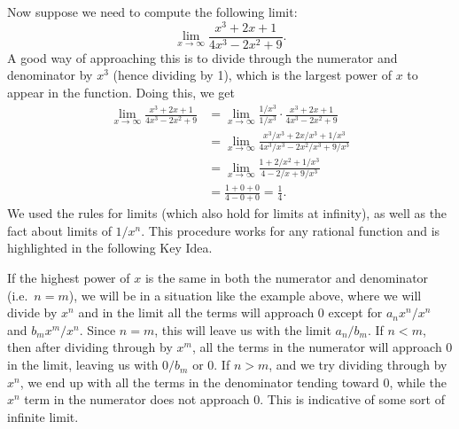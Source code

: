 

Now suppose we need to compute the following limit:
\[\lim_{x\rightarrow\infty}\frac{x^3+2x+1}{4x^3-2x^2+9}.\]
A good way of approaching this is to divide through the numerator and denominator by $x^3$ (hence dividing by 1), which is the largest power of $x$ to appear in the function.  Doing this, we get
\begin{align*}
\lim_{x\to\infty}\frac{x^3+2x+1}{4x^3-2x^2+9} &=
\lim_{x\to\infty}\frac{1/x^3}{1/x^3}\cdot\frac{x^3+2x+1}{4x^3-2x^2+9}\\ &=\lim_{x\to\infty}\frac{x^3/x^3+2x/x^3+1/x^3}{4x^3/x^3-2x^2/x^3+9/x^3}\\ &= \lim_{x\to\infty}\frac{1+2/x^2+1/x^3}{4-2/x+9/x^3}\\
&=\frac{1+0+0}{4-0+0}=\frac14.
\end{align*}
We used the rules for limits (which also hold for limits at infinity), as well as the fact about limits of $1/x^n$. This procedure works for any rational function and is highlighted in the following Key Idea.


If the highest power of $x$ is the same in both the numerator and denominator (i.e.\ $n=m$), we will be in a situation like the example above, where we will divide by $x^n$ and in the limit all the terms will approach 0 except for $a_nx^n/x^n$ and $b_mx^m/x^n$. Since $n=m$, this will leave us with the limit $a_n/b_m$.  If $n<m$, then after dividing through by $x^m$, all the terms in the numerator will approach 0 in the limit, leaving us with $0/b_m$ or 0.  If $n>m$, and we try dividing through by $x^n$, we end up with all the terms in the denominator tending toward 0, while the $x^n$ term in the numerator does not approach 0.  This is indicative of some sort of infinite limit.

